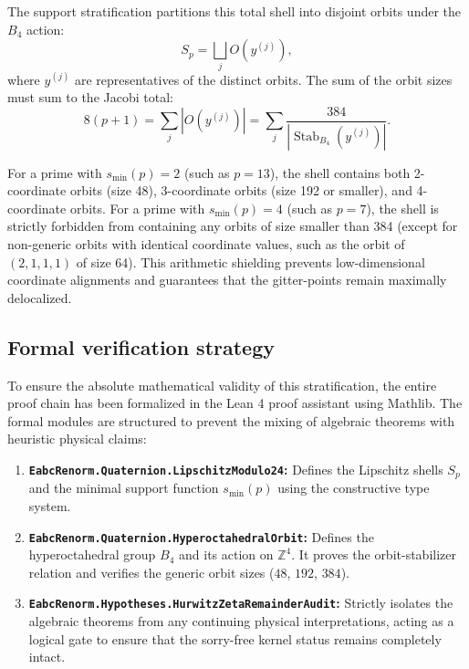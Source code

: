 \documentclass[11pt,a4paper]{article}
\theoremstyle{definition}
\begin{document}
	The support stratification partitions this total shell into disjoint orbits under the $B_4$ action:
	\begin{equation}
		S_p = \bigsqcup_{j} O(y^{(j)}),
	\end{equation}
	where $y^{(j)}$ are representatives of the distinct orbits. The sum of the orbit sizes must sum to the Jacobi total:
	\begin{equation}
		8(p+1) = \sum_{j} |O(y^{(j)})| = \sum_{j} \frac{384}{|\operatorname{Stab}_{B_4}(y^{(j)})|}.
	\end{equation}
	
	For a prime with $s_{\min}(p) = 2$ (such as $p=13$), the shell contains both 2-coordinate orbits (size 48), 3-coordinate orbits (size 192 or smaller), and 4-coordinate orbits. For a prime with $s_{\min}(p) = 4$ (such as $p=7$), the shell is strictly forbidden from containing any orbits of size smaller than 384 (except for non-generic orbits with identical coordinate values, such as the orbit of $(2,1,1,1)$ of size 64). This arithmetic shielding prevents low-dimensional coordinate alignments and guarantees that the gitter-points remain maximally delocalized.
	
	\subsection{Formal verification strategy}
	To ensure the absolute mathematical validity of this stratification, the entire proof chain has been formalized in the Lean 4 proof assistant using Mathlib. The formal modules are structured to prevent the mixing of algebraic theorems with heuristic physical claims:
	
	\begin{enumerate}
		\item \textbf{\texttt{EabcRenorm.Quaternion.LipschitzModulo24}:}
		Defines the Lipschitz shells $S_p$ and the minimal support function $s_{\min}(p)$ using the constructive type system.
		\item \textbf{\texttt{EabcRenorm.Quaternion.HyperoctahedralOrbit}:}
		Defines the hyperoctahedral group $B_4$ and its action on $\mathbb{Z}^4$. It proves the orbit-stabilizer relation and verifies the generic orbit sizes ($48$, $192$, $384$).
		\item \textbf{\texttt{EabcRenorm.Hypotheses.HurwitzZetaRemainderAudit}:}
		Strictly isolates the algebraic theorems from any continuing physical interpretations, acting as a logical gate to ensure that the sorry-free kernel status remains completely intact.
	\end{enumerate}
	
\end{document}
